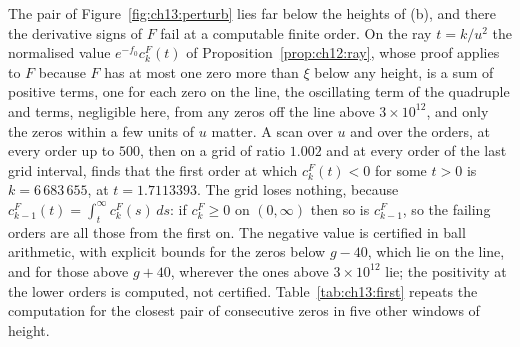 The pair of Figure~\ref{fig:ch13:perturb} lies far below the heights of (b), and there the derivative signs of $F$ fail at a computable finite order. On the ray $t=k/u^2$ the normalised value $e^{-f_0}c_k^F(t)$ of Proposition~\ref{prop:ch12:ray}, whose proof applies to $F$ because $F$ has at most one zero more than $\xi$ below any height, is a sum of positive terms, one for each zero on the line, the oscillating term of the quadruple and terms, negligible here, from any zeros off the line above $3\times10^{12}$, and only the zeros within a few units of $u$ matter. A scan over $u$ and over the orders, at every order up to $500$, then on a grid of ratio $1.002$ and at every order of the last grid interval, finds that the first order at which $c_k^F(t)<0$ for some $t>0$ is $k=6\,683\,655$, at $t=1.7113393$. The grid loses nothing, because $c_{k-1}^F(t)=\int_t^\infty c_k^F(s)\,ds$: if $c_k^F\ge0$ on $(0,\infty)$ then so is $c_{k-1}^F$, so the failing orders are all those from the first on. The negative value is certified in ball arithmetic, with explicit bounds for the zeros below $g-40$, which lie on the line, and for those above $g+40$, wherever the ones above $3\times10^{12}$ lie; the positivity at the lower orders is computed, not certified. Table~\ref{tab:ch13:first} repeats the computation for the closest pair of consecutive zeros in five other windows of height.

